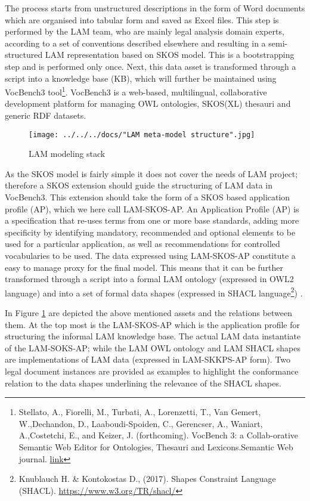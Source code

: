 The process starts from unstructured descriptions in the form of Word
documents which are organised into tabular form and saved as Excel
files. This step is performed by the LAM team, who are mainly legal
analysis domain experts, according to a set of conventions described
elsewhere and resulting in a semi-structured LAM representation based on
SKOS model. This is a bootstrapping step and is performed only once.
Next, this data asset is transformed through a script into a knowledge
base (KB), which will further be maintained using VocBench3
tool\footnote{Stellato, A., Fiorelli,
	M., Turbati, A., Lorenzetti, T., Van Gemert, W.,Dechandon, D., Laaboudi-Spoiden, C., Gerencser, A., Waniart, A.,Costetchi, E., and Keizer, J. (forthcoming). VocBench 3: a Collab-orative Semantic Web Editor for Ontologies, Thesauri and Lexicons.Semantic Web journal. \href{http://www.semantic-web-journal.net/content/vocbench-3-collaborative-semantic-web-editor-ontologies-thesauri-and-lexicons-1}{link}}. VocBench3 is a
web-based, multilingual, collaborative development platform for managing
OWL ontologies, SKOS(XL) thesauri and generic RDF datasets.

\begin{figure}[!ht]
	\centering
	\texttt{[image: ../../../docs/"LAM meta-model structure".jpg]}
	\caption{LAM modeling stack}
	\label{fig:meta-model}
\end{figure}

As the SKOS model is fairly simple it does not cover the needs of LAM
project; therefore a SKOS extension should guide the structuring of LAM
data in VocBench3. This extension should take the form of a SKOS based
application profile (AP), which we here call LAM-SKOS-AP. An Application
Profile (AP) is a specification that re-uses terms from one or more base
standards, adding more specificity by identifying mandatory, recommended
and optional elements to be used for a particular application, as well
as recommendations for controlled vocabularies to be used. The data
expressed using LAM-SKOS-AP constitute a easy to manage proxy for the
final model. This means that it can be further transformed through a
script into a formal LAM ontology (expressed in OWL2 language) and into
a set of formal data shapes (expressed in SHACL
language\footnote{Knublauch H. \& Kontokostas D., (2017). Shapes Constraint Language (SHACL). \url{https://www.w3.org/TR/shacl/}}) .

In Figure \ref{fig:meta-model} are depicted the above mentioned assets and the
relations between them. At the top most is the LAM-SKOS-AP which is the
application profile for structuring the informal LAM knowledge base. The
actual LAM data instantiate of the LAM-SOKS-AP; while the LAM OWL
ontology and LAM SHACL shapes are implementations of LAM data (expressed
in LAM-SKKPS-AP form). Two legal document instances are provided as
examples to highlight the conformance relation to the data shapes
underlining the relevance of the SHACL shapes.

